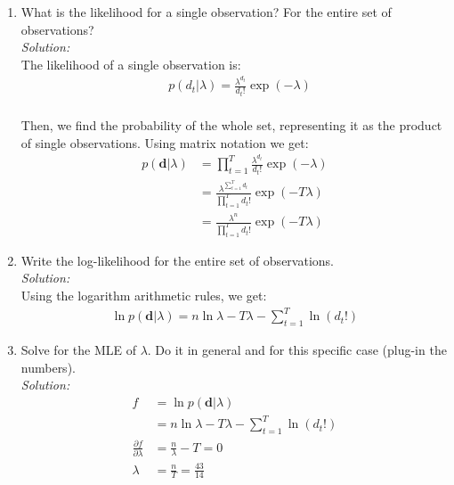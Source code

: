 \documentclass[12pt,a4paper]{article}
\begin{document}
\begin{enumerate}
  \item What is the likelihood for a single observation?  For the entire set of observations? \\
	  \emph{Solution:} \\
		  The likelihood of a single observation is: \\
		  \begin{align*}
		  &p(d_t\vert \lambda) = \frac{\lambda^{d_t}}{d_t!}\exp(-\lambda) \\
		  \end{align*}
		  
		  Then, we find the probability of the whole set, representing it as the product of single observations. Using matrix notation we get: \\
		  \begin{align*}      
		  p(\textbf{d} \vert \lambda)&=\prod_{t=1}^{T} \frac{\lambda^{d_t}}{d_t!}\exp(-\lambda) \\
		  &=\frac{\lambda^{\sum_{t=1}^{T}d_t}}{\prod_{t=1}^{T}d_t!}\exp(-T\lambda) \\
		  &=\frac{\lambda^{n}}{\prod_{t=1}^{T}d_t!}\exp(-T\lambda)
		  \end{align*} 
  
  \item Write the log-likelihood for the entire set of observations. \\
	  \emph{Solution:} \\
		  Using the logarithm arithmetic rules, we get: \\        
		  
		  \begin{align*}
		  \ln p(\textbf{d}\vert\lambda) = n\ln\lambda - T \lambda - \sum_{t=1}^{T}\ln(d_t!)
		  \end{align*}
  
   
  \item Solve for the MLE of $\lambda$.  Do it in general and for this specific case (plug-in the numbers). \\
	  \emph{Solution:} \\
		  \begin{align*}
		  	f &= \ln p(\textbf{d} \vert \lambda)\\ 
		  	&= n \ln\lambda - T\lambda- \sum_{t=1}^{T}\ln(d_t!) \\
		  	\frac{\partial f}{\partial \lambda} &= \frac{n}{\lambda} - T = 0 \\
		  	\lambda &= \frac{n}{T} = \frac{43}{14}
		  \end{align*}
  

\end{enumerate}
\end{document}
